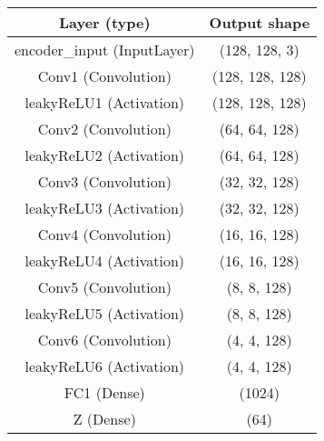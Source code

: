 \documentclass[journal,twoside,web]{IEEEtran}
\renewcommand{\textrightarrow}{}
\begin{document}
\begin{figure*}[th]
\centering
      \\
 \caption{Confusion Matrices for ADDA, GTA, DIRT-T, TAT, DAL and TIGDA on task A\textrightarrow C. Classes are Neutrophil (NE), Lymphocyte (LY), Monocyte (MO), Eosinophil (EO), Basophil (BA), Immature granulocytes (IG), Atypical (AT), Nucleated red blood cells (NR), Giant platelets (GP), Platelet clumps (PC), Artefact (AF).}
\label{fig:pca}
\end{figure*}

\begin{table*}
\caption{Encoder architecture for the Variational Auto-Encoder (VAE) in the proposed method (TIGDA). Convolution kernel is  and for Leaky ReLU .}
\centering
  \begin{tabular}{cc}
    \toprule
        {Layer (type)} & Output shape 
        \\
    \midrule
    encoder\_input (InputLayer) & (128, 128, 3) \\
    Conv1 (Convolution) & (128, 128, 128) \\
    leakyReLU1 (Activation) & (128, 128, 128) \\
    Conv2 (Convolution) & (64, 64, 128) \\
    leakyReLU2 (Activation) & (64, 64, 128)\\
    Conv3 (Convolution) & (32, 32, 128) \\
    leakyReLU3 (Activation) & (32, 32, 128) \\
    Conv4 (Convolution) & (16, 16, 128) \\
    leakyReLU4 (Activation) & (16, 16, 128) \\
    Conv5 (Convolution) & (8, 8, 128) \\
    leakyReLU5 (Activation) & (8, 8, 128) \\
    Conv6 (Convolution) & (4, 4, 128) \\
    leakyReLU6 (Activation) & (4, 4, 128) \\
    FC1 (Dense) & (1024) \\
    Z (Dense) & (64) \\
    \bottomrule
  \end{tabular}
  \label{table:enc}
\end{table*}
\end{document}

